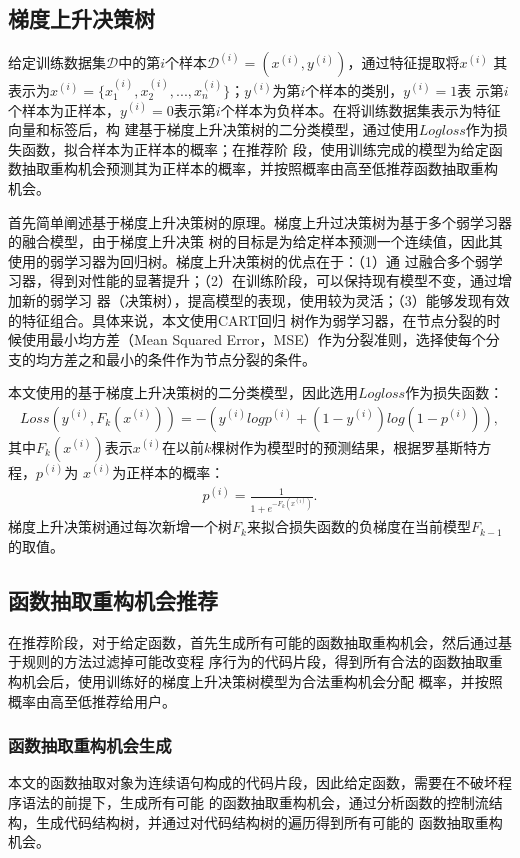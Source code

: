 \subsection{梯度上升决策树}
给定训练数据集$\mathcal D$中的第$i$个样本${\mathcal D}^{(i)}=(x^{(i)},y^{(i)})$，通过特征提取将$x^{(i)}$
其表示为$x^{(i)}=\{x_1^{(i)},x_2^{(i)},...,x_n^{(i)}\}$；$y^{(i)}$为第$i$个样本的类别，$y^{(i)}=1$表
示第$i$个样本为正样本，$y^{(i)}=0$表示第$i$个样本为负样本。在将训练数据集表示为特征向量和标签后，构
建基于梯度上升决策树的二分类模型，通过使用$Logloss$作为损失函数，拟合样本为正样本的概率；在推荐阶
段，使用训练完成的模型为给定函数抽取重构机会预测其为正样本的概率，并按照概率由高至低推荐函数抽取重构
机会。

首先简单阐述基于梯度上升决策树的原理。梯度上升过决策树为基于多个弱学习器的融合模型，由于梯度上升决策
树的目标是为给定样本预测一个连续值，因此其使用的弱学习器为回归树。梯度上升决策树的优点在于：（1）通
过融合多个弱学习器，得到对性能的显著提升；（2）在训练阶段，可以保持现有模型不变，通过增加新的弱学习
器（决策树），提高模型的表现，使用较为灵活；（3）能够发现有效的特征组合。具体来说，本文使用CART回归
树作为弱学习器，在节点分裂的时候使用最小均方差（Mean Squared Error，MSE）作为分裂准则，选择使每个分
支的均方差之和最小的条件作为节点分裂的条件。

本文使用的基于梯度上升决策树的二分类模型，因此选用$Logloss$作为损失函数：
\begin{eqnarray}
  Loss(y^{(i)},F_k(x^{(i)})) = -(y^{(i)}logp^{(i)} + (1-y^{(i)})log(1-p^{(i)})),
\end{eqnarray}\label{logloss}
其中$F_k(x^{(i)})$表示$x^{(i)}$在以前$k$棵树作为模型时的预测结果，根据罗基斯特方程，$p^{(i)}$为
$x^{(i)}$为正样本的概率：
\begin{eqnarray}
  p^{(i)} = \frac{1}{1 + e^{-F_k(x^{(i)})}}.
\end{eqnarray}
梯度上升决策树通过每次新增一个树$F_k$来拟合损失函数的负梯度在当前模型$F_{k-1}$的取值。

\subsection{函数抽取重构机会推荐}
在推荐阶段，对于给定函数，首先生成所有可能的函数抽取重构机会，然后通过基于规则的方法过滤掉可能改变程
序行为的代码片段，得到所有合法的函数抽取重构机会后，使用训练好的梯度上升决策树模型为合法重构机会分配
概率，并按照概率由高至低推荐给用户。

\subsubsection{函数抽取重构机会生成}
本文的函数抽取对象为连续语句构成的代码片段，因此给定函数，需要在不破坏程序语法的前提下，生成所有可能
的函数抽取重构机会，通过分析函数的控制流结构，生成代码结构树，并通过对代码结构树的遍历得到所有可能的
函数抽取重构机会。

